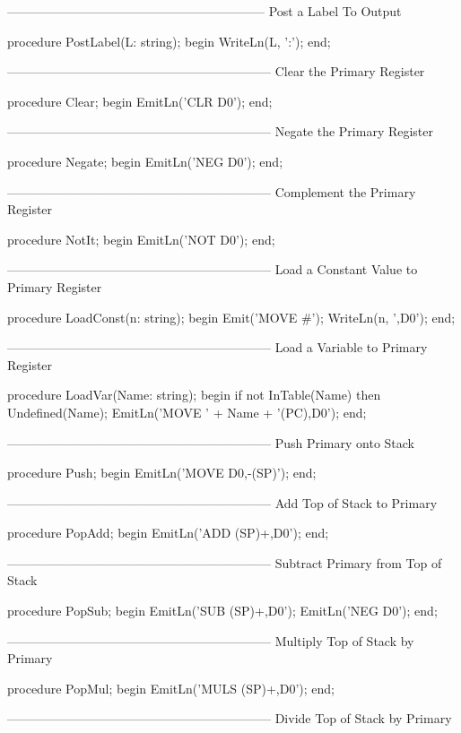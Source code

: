 \documentclass[float=false, crop=false]{standalone}
\begin{document}
\begin{code}
{--------------------------------------------------------------}
{ Post a Label To Output }

procedure PostLabel(L: string);
begin
   WriteLn(L, ':');
end;


{---------------------------------------------------------------}
{ Clear the Primary Register }

procedure Clear;
begin
   EmitLn('CLR D0');
end;


{---------------------------------------------------------------}
{ Negate the Primary Register }

procedure Negate;
begin
   EmitLn('NEG D0');
end;


{---------------------------------------------------------------}
{ Complement the Primary Register }

procedure NotIt;
begin
   EmitLn('NOT D0');
end;


{---------------------------------------------------------------}
{ Load a Constant Value to Primary Register }

procedure LoadConst(n: string);
begin
   Emit('MOVE #');
   WriteLn(n, ',D0');
end;


{---------------------------------------------------------------}
{ Load a Variable to Primary Register }

procedure LoadVar(Name: string);
begin
   if not InTable(Name) then Undefined(Name);
   EmitLn('MOVE ' + Name + '(PC),D0');
end;


{---------------------------------------------------------------}
{ Push Primary onto Stack }

procedure Push;
begin
   EmitLn('MOVE D0,-(SP)');
end;


{---------------------------------------------------------------}
{ Add Top of Stack to Primary }

procedure PopAdd;
begin
   EmitLn('ADD (SP)+,D0');
end;


{---------------------------------------------------------------}
{ Subtract Primary from Top of Stack }

procedure PopSub;
begin
   EmitLn('SUB (SP)+,D0');
   EmitLn('NEG D0');
end;


{---------------------------------------------------------------}
{ Multiply Top of Stack by Primary }

procedure PopMul;
begin
   EmitLn('MULS (SP)+,D0');
end;


{---------------------------------------------------------------}
{ Divide Top of Stack by Primary }


\end{code}
\end{document}
